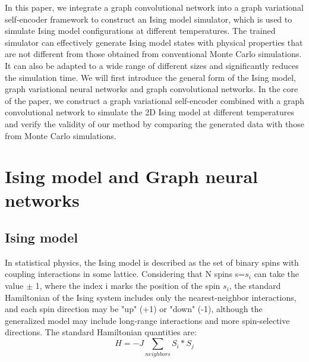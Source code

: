 \documentclass[%
reprint,
amsmath,amssymb,
aps,
]{revtex4-2}
\begin{document}
	
	In this paper, we integrate a graph convolutional network into a graph variational self-encoder framework to construct an Ising model simulator, which is used to simulate Ising model configurations at different temperatures. The trained simulator can effectively generate Ising model states with physical properties that are not different from those obtained from conventional Monte Carlo simulations. It can also be adapted to a wide range of different sizes and significantly reduces the simulation time. We will first introduce the general form of the Ising model, graph variational neural networks and graph convolutional networks. In the core of the paper, we construct a graph variational self-encoder combined with a graph convolutional network to simulate the 2D Ising model at different temperatures and verify the validity of our method by comparing the generated data with those from Monte Carlo simulations.
	
	\section{Ising model and Graph neural networks}
	
	\subsection{Ising model}
	
	In statistical physics, the Ising model is described as the set of binary spins with coupling interactions in some lattice. Considering that N spins s={$s_i$} can take the value $\pm$ 1, where the index i marks the position of the spin $s_i$, the standard Hamiltonian of the Ising system includes only the nearest-neighbor interactions, and each spin direction may be "up" (+1) or "down" (-1), although the generalized model may include long-range interactions and more spin-selective directions. The standard Hamiltonian quantities are:
    \begin{equation}
    H = -J\sum_{neighbors}S_i*S_j
	\end{equation}
\end{document}
